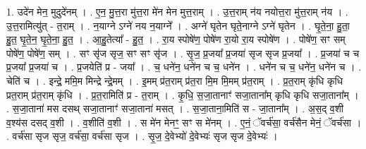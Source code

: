 \documentclass[17pt]{extarticle}
\begin{document}
1. उदे॑न मेन॒ मुदुदे॑नम् । . ए॒न॒ मु॒त्त॒रा मु॑त्त॒रा मे॑न मेन मुत्त॒राम् । . उ॒त्त॒राम् न॑य नयोत्त॒रा मु॑त्त॒राम् न॑य । . उ॒त्त॒रामित्यु॑त् - त॒राम् । . न॒याग्ने ऽग्ने॑ नय न॒याग्ने᳚ । . अग्ने॑ घृतेन घृते॒नाग्ने ऽग्ने॑ घृतेन । . घृ॒ते॒ना॒ हु॒ता॒ हु॒त॒ घृ॒ते॒न॒ घृ॒ते॒ना॒ हु॒त॒ । . आ॒हु॒तेत्या᳚ - हु॒त॒ । . रा॒य स्पोषे॑ण॒ पोषे॑ण रा॒यो रा॒य स्पोषे॑ण । . पोषे॑ण॒ सꣳ सम् पोषे॑ण॒ पोषे॑ण॒ सम् । . सꣳ सृ॑ज सृज॒ सꣳ सꣳ सृ॑ज । . सृ॒ज॒ प्र॒जया᳚ प्र॒जया॑ सृज सृज प्र॒जया᳚ । . प्र॒जया॑ च च प्र॒जया᳚ प्र॒जया॑ च । . प्र॒जयेति॑ प्र - जया᳚ । . च॒ धने॑न॒ धने॑न च च॒ धने॑न । . धने॑न च च॒ धने॑न॒ धने॑न च । . चेति॑ च । . इन्द्रे॒ ममि॒म मिन्द्रे न्द्रे॒मम् । . इ॒मम् प्र॑त॒राम् प्र॑त॒रा मि॒म मि॒मम् प्र॑त॒राम् । . प्र॒त॒राम् कृ॑धि कृधि प्रत॒राम् प्र॑त॒राम् कृ॑धि । . प्र॒त॒रामिति॑ प्र - त॒राम् । . कृ॒धि॒ स॒जा॒तानाꣳ॑ सजा॒ताना᳚म् कृधि कृधि सजा॒ताना᳚म् । . स॒जा॒ताना॑ मस दसथ् सजा॒तानाꣳ॑ सजा॒ताना॑ मसत् । . स॒जा॒ताना॒मिति॑ स - जा॒ताना᳚म् । . अ॒स॒द् व॒शी व॒श्य॑स दसद् व॒शी । . व॒शीति॑ व॒शी । . स मे॑न मेनꣳ॒॒ सꣳ स मे॑नम् । . ए॒नं॒ ॅवर्च॑सा॒ वर्च॑सैन मेनं॒ ॅवर्च॑सा । . वर्च॑सा सृज सृज॒ वर्च॑सा॒ वर्च॑सा सृज । . सृ॒ज॒ दे॒वेभ्यो॑ दे॒वेभ्यः॑ सृज सृज दे॒वेभ्यः॑ । \newline
\end{document}
